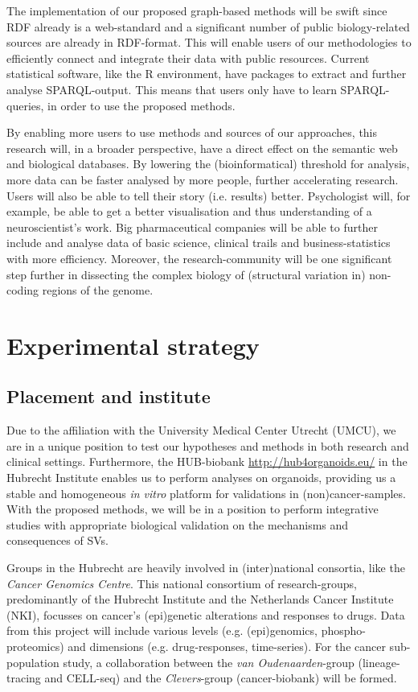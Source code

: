 \documentclass[twoside,fontsize=12pt]{article}
\begin{document}
\noindent
The implementation of our proposed graph-based methods will be swift since RDF already is a web-standard and a significant number of public biology-related sources are already in RDF-format. This will enable users of our methodologies to efficiently connect and integrate their data with public resources. Current statistical software, like the R environment, have packages to extract and further analyse SPARQL-output. This means that users only have to learn SPARQL-queries, in order to use the proposed methods.

By enabling more users to use methods and sources of our approaches, this research will, in a broader perspective, have a direct effect on the semantic web and biological databases. By lowering the (bioinformatical) threshold for analysis, more data can be faster analysed by more people, further accelerating research. Users will also be able to tell their story (i.e. results) better. Psychologist will, for example, be able to get a better visualisation and thus understanding of a neuroscientist's work. Big pharmaceutical companies will be able to further include and analyse data of basic science, clinical trails and business-statistics with more efficiency. Moreover, the research-community will be one significant step further in dissecting the complex biology of (structural variation in) non-coding regions of the genome.

\section*{Experimental strategy}
\subsection*{Placement and institute}
Due to the affiliation with the University Medical Center Utrecht (UMCU), we are in a unique position to test our hypotheses and methods in both research and clinical settings. Furthermore, the HUB-biobank \url{http://hub4organoids.eu/} in the Hubrecht Institute  enables us to perform analyses on organoids, providing us a stable and homogeneous \textit{in vitro} platform for validations in (non)cancer-samples. With the proposed methods, we will be in a position to perform integrative studies with appropriate biological validation on the mechanisms and consequences of SVs. 

Groups in the Hubrecht are heavily involved in (inter)national consortia, like the \textit{Cancer Genomics Centre}. This national consortium of research-groups, predominantly of the Hubrecht Institute and the Netherlands Cancer Institute (NKI), focusses on cancer's (epi)genetic alterations and responses to drugs. Data from this project will include various levels (e.g. (epi)genomics, phospho-proteomics) and dimensions (e.g. drug-responses, time-series). For the cancer sub-population study, a collaboration between the \textit{van Oudenaarden}-group (lineage-tracing and CELL-seq) and the \textit{Clevers}-group (cancer-biobank) will be formed.
\end{document}
